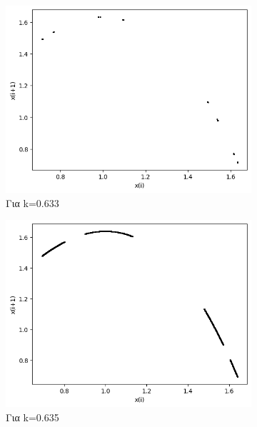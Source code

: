 \begin{figure}
	\centering
	\begin{subfigure}[b]{0.4\textwidth}
		\centering
		\includegraphics[width=\textwidth]{LateX images/graphs q09/g7}
		\caption{Για k=0.633}
		\label{f:k53}
	\end{subfigure}
	\hfill
	\begin{subfigure}[b]{0.4\textwidth}
		\centering
		\includegraphics[width=\textwidth]{LateX images/graphs q09/g8}
		\caption{Για k=0.635}
		\label{f:k54}
	\end{subfigure}
	\hfill
	\begin{subfigure}[b]{0.4\textwidth}
		\centering

\end{subfigure}
\end{figure}
